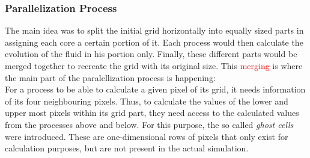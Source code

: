 \documentclass[12pt, a4paper, titlepage]{article}
\newcommand{\vp}{\vspace{1cm}}
\begin{document}
{\vp
\subsubsection{Parallelization Process}
%
The main idea was to split the initial grid horizontally into equally sized parts in assigning each core a certain portion of it. Each process would then calculate the evolution of the fluid in his portion only. Finally, these different parts would be merged together to recreate the grid with its original size. This \textcolor{red}{merging} is where the main part of the paralellization process is happening:\\
For a process to be able to calculate a given pixel of its grid, it needs information of its four neighbouring pixels. Thus, to calculate the values of the lower and upper most pixels within its grid part, they need access to the calculated values from the processes above and below. For this purpose, the so called \textit{ghost cells} were introduced. These are one-dimensional rows of pixels that only exist for calculation purposes, but are not present in the actual simulation.
%			
}
\end{document}
